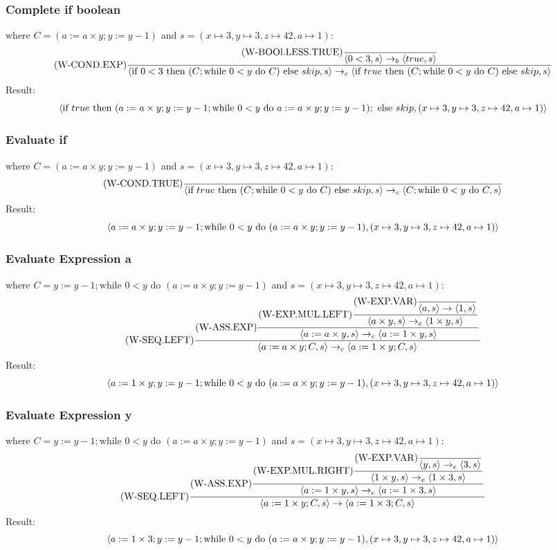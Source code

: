 \documentclass{report}
\begin{document}
\subsubsection*{Complete if boolean}
where $C = (a:= a \times y; y:= y - 1)$ and $s = (x \mapsto 3, y \mapsto 3, z \mapsto 42, a \mapsto 1)$:
\[\text{(W-COND.EXP)}\dfrac{
		\text{(W-BOOl.LESS.TRUE)}\dfrac{}{\langle 0<3, s \rangle \to_b \langle true, s \rangle}
	}{\langle \text{if } 0<3 \text{ then } (C; \text{while } 0<y \text{ do } C) \text{ else } skip, s \rangle \to_c \langle \text{if } true \text{ then } (C; \text{while } 0<y \text{ do } C) \text{ else } skip, s \rangle}\]
Result:
\[\langle \text{if } true \text{ then } (a:= a \times y; y:= y - 1; \text{while } 0<y \text{ do } a:= a \times y; y:= y - 1); \text{ else } skip, (x \mapsto 3, y \mapsto 3, z \mapsto 42, a \mapsto 1) \rangle\]
\subsubsection*{Evaluate if}
where $C = (a:= a \times y; y:= y - 1)$ and $s = (x \mapsto 3, y \mapsto 3, z \mapsto 42, a \mapsto 1)$:
\[\text{(W-COND.TRUE)}\dfrac{}{\langle \text{if } true \text{ then } (C; \text{while } 0<y \text{ do } C) \text{ else } skip, s \rangle \to_c \langle C; \text{while } 0<y \text{ do } C, s \rangle}\]
Result:
\[\langle a:= a \times y; y:= y - 1; \text{while } 0<y \text{ do } (a:= a \times y; y:= y - 1), (x \mapsto 3, y \mapsto 3, z \mapsto 42, a \mapsto 1) \rangle\]
\subsubsection*{Evaluate Expression a}
where $C = y:= y - 1;  \text{while } 0<y \text{ do } (a:= a \times y; y:= y - 1)$ and $s = (x \mapsto 3, y \mapsto 3, z \mapsto 42, a \mapsto 1)$:
\[\text{(W-SEQ.LEFT)}\dfrac{
		\text{(W-ASS.EXP)}\dfrac{
			\text{(W-EXP.MUL.LEFT)}\dfrac{
				\text{(W-EXP.VAR)}\dfrac{}{\langle a, s \rangle \to \langle 1, s \rangle}
			}{\langle a \times y, s \rangle \to_e \langle 1 \times y, s \rangle}
		}{\langle a := a \times y, s \rangle \to_c \langle a := 1 \times y, s \rangle}
	}{\langle a := a \times y; C, s \rangle \to_c \langle a := 1 \times y; C, s \rangle}\]
Result:
\[\langle a := 1 \times y; y:= y - 1;  \text{while } 0<y \text{ do } (a:= a \times y; y:= y - 1), (x \mapsto 3, y \mapsto 3, z \mapsto 42, a \mapsto 1) \rangle\]
\subsubsection*{Evaluate Expression y}
where $C = y:= y - 1;  \text{while } 0<y \text{ do } (a:= a \times y; y:= y - 1)$ and $s = (x \mapsto 3, y \mapsto 3, z \mapsto 42, a \mapsto 1)$:
\[\text{(W-SEQ.LEFT)}\dfrac{
		\text{(W-ASS.EXP)}\dfrac{
			\text{(W-EXP.MUL.RIGHT)}\dfrac{
				\text{(W-EXP.VAR)}\dfrac{}{\langle y, s \rangle \to_e \langle 3, s \rangle}
			}{\langle 1 \times y, s \rangle \to_e \langle 1 \times 3, s \rangle}
		}{\langle a := 1 \times y, s \rangle \to_c \langle a := 1 \times 3, s \rangle}
	}{\langle a := 1 \times y; C, s \rangle \to \langle a := 1 \times 3; C, s \rangle}\]
Result:
\[\langle a := 1 \times 3; y:= y - 1;  \text{while } 0<y \text{ do } (a:= a \times y; y:= y - 1), (x \mapsto 3, y \mapsto 3, z \mapsto 42, a \mapsto 1) \rangle\]
\end{document}
